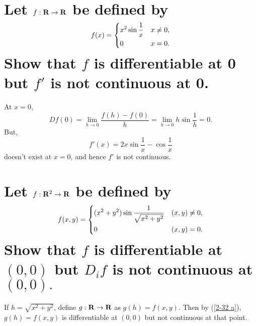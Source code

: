 \question{
    [2-32]
}
\begin{parts}
    \part{
        \label{2-32 a}
        Let $f:\mathbf{R}\to\mathbf{R}$ be defined by
        $$f(x)=
        \begin{dcases}
            x^2\sin{\frac{1}{x}}
                &x\ne 0,\\
            0&x=0.
        \end{dcases}$$
        Show that $f$ is differentiable
        at 0 but $f'$ is not continuous
        at 0. 
    }
    \begin{solution}
    At $x=0$,
    $$Df(0)=\lim_{h\to 0}{\frac
    {f(h)-f(0)}{h}}=\lim_{h\to 0}{
    h\sin{\frac{1}{h}}}=0.$$
    But,
    $$f'(x)=2x\sin{\frac{1}{x}}-\cos{
    \frac{1}{x}}$$
    doesn't exist at $x=0$, and hence
    $f'$ is not continuous.
    \end{solution}

    \part{
        Let $f:\mathbf{R}^2\to\mathbf{R}$ be defined
        by
        $$f(x,y)=\begin{dcases}
            (x^2+y^2)\sin{\dfrac{1}
            {\sqrt{x^2+y^2}}}
            &(x,y)\ne 0,\\
            0&(x,y)=0.
        \end{dcases}$$
        Show that $f$ is differentiable
        at $(0,0)$ but $D_if$ is not
        continuous at $(0,0).$
    }
    \begin{solution}
        If $h=\sqrt{x^2+y^2}$, define
        $g:\mathbf{R}\to\mathbf{R}$ as $g(h)=
        f(x,y)$. Then by (\ref{2-32 a}),
        $g(h)=f(x,y)$ is differentiable
        at $(0,0)$ but not continuous
        at that point.
    \end{solution}
\end{parts}